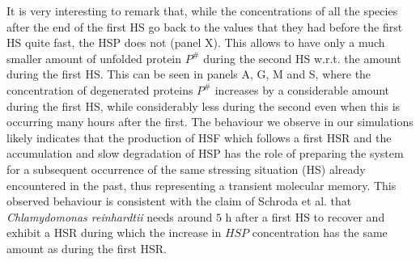\documentclass[oneside, 10pt, a4paper, twocolumn]{article}
\begin{document}
It is very interesting to remark that, while the concentrations of all the species {after the end of the first HS go back to the values that they had before the first HS quite fast, the HSP does not (panel X). This allows to have only a much smaller amount of unfolded protein $P^\#$ during the second HS w.r.t. the amount during the first HS.} This can be seen in panels A, G, M and S, where the concentration of degenerated proteins $P^\#$ increases by a considerable amount during the first HS, while considerably less during the second even when this is occurring many hours after the first. %
The behaviour we observe in our simulations likely indicates that the production of HSF which follows a first HSR and the accumulation and slow degradation of HSP has the role of preparing the system for a subsequent occurrence of the same stressing situation (HS) already encountered in the past, thus representing a transient molecular memory. This observed behaviour is consistent with the claim of Schroda et al. \cite{Schroda2000} that \emph{Chlamydomonas reinhardtii} needs around $5$ h {after a first HS to recover and exhibit a HSR during which the increase in $HSP$ concentration has the same amount as during the first HSR.} %

\end{document}
